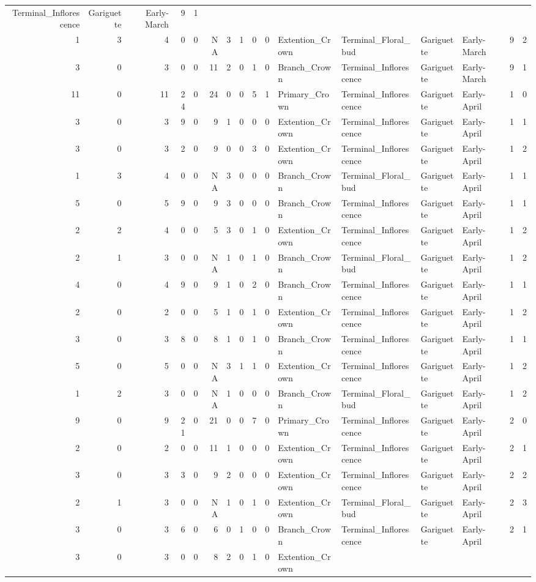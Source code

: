 \documentclass[]{article}
\begin{document}
\begin{longtable}[]{@{}rrrrrrrrrrllllrl@{}}
Terminal\_Inflorescence & Gariguette & Early-March & 9 &
1\tabularnewline
1 & 3 & 4 & 0 & 0 & NA & 3 & 1 & 0 & 0 & Extention\_Crown &
Terminal\_Floral\_bud & Gariguette & Early-March & 9 & 2\tabularnewline
3 & 0 & 3 & 0 & 0 & 11 & 2 & 0 & 1 & 0 & Branch\_Crown &
Terminal\_Inflorescence & Gariguette & Early-March & 9 &
1\tabularnewline
11 & 0 & 11 & 24 & 0 & 24 & 0 & 0 & 5 & 1 & Primary\_Crown &
Terminal\_Inflorescence & Gariguette & Early-April & 1 &
0\tabularnewline
3 & 0 & 3 & 9 & 0 & 9 & 1 & 0 & 0 & 0 & Extention\_Crown &
Terminal\_Inflorescence & Gariguette & Early-April & 1 &
1\tabularnewline
3 & 0 & 3 & 2 & 0 & 9 & 0 & 0 & 3 & 0 & Extention\_Crown &
Terminal\_Inflorescence & Gariguette & Early-April & 1 &
2\tabularnewline
1 & 3 & 4 & 0 & 0 & NA & 3 & 0 & 0 & 0 & Branch\_Crown &
Terminal\_Floral\_bud & Gariguette & Early-April & 1 & 1\tabularnewline
5 & 0 & 5 & 9 & 0 & 9 & 3 & 0 & 0 & 0 & Branch\_Crown &
Terminal\_Inflorescence & Gariguette & Early-April & 1 &
1\tabularnewline
2 & 2 & 4 & 0 & 0 & 5 & 3 & 0 & 1 & 0 & Extention\_Crown &
Terminal\_Inflorescence & Gariguette & Early-April & 1 &
2\tabularnewline
2 & 1 & 3 & 0 & 0 & NA & 1 & 0 & 1 & 0 & Branch\_Crown &
Terminal\_Floral\_bud & Gariguette & Early-April & 1 & 2\tabularnewline
4 & 0 & 4 & 9 & 0 & 9 & 1 & 0 & 2 & 0 & Branch\_Crown &
Terminal\_Inflorescence & Gariguette & Early-April & 1 &
1\tabularnewline
2 & 0 & 2 & 0 & 0 & 5 & 1 & 0 & 1 & 0 & Extention\_Crown &
Terminal\_Inflorescence & Gariguette & Early-April & 1 &
2\tabularnewline
3 & 0 & 3 & 8 & 0 & 8 & 1 & 0 & 1 & 0 & Branch\_Crown &
Terminal\_Inflorescence & Gariguette & Early-April & 1 &
1\tabularnewline
5 & 0 & 5 & 0 & 0 & NA & 3 & 1 & 1 & 0 & Extention\_Crown &
Terminal\_Inflorescence & Gariguette & Early-April & 1 &
2\tabularnewline
1 & 2 & 3 & 0 & 0 & NA & 1 & 0 & 0 & 0 & Branch\_Crown &
Terminal\_Floral\_bud & Gariguette & Early-April & 1 & 2\tabularnewline
9 & 0 & 9 & 21 & 0 & 21 & 0 & 0 & 7 & 0 & Primary\_Crown &
Terminal\_Inflorescence & Gariguette & Early-April & 2 &
0\tabularnewline
2 & 0 & 2 & 0 & 0 & 11 & 1 & 0 & 0 & 0 & Extention\_Crown &
Terminal\_Inflorescence & Gariguette & Early-April & 2 &
1\tabularnewline
3 & 0 & 3 & 3 & 0 & 9 & 2 & 0 & 0 & 0 & Extention\_Crown &
Terminal\_Inflorescence & Gariguette & Early-April & 2 &
2\tabularnewline
2 & 1 & 3 & 0 & 0 & NA & 1 & 0 & 1 & 0 & Extention\_Crown &
Terminal\_Floral\_bud & Gariguette & Early-April & 2 & 3\tabularnewline
3 & 0 & 3 & 6 & 0 & 6 & 0 & 1 & 0 & 0 & Branch\_Crown &
Terminal\_Inflorescence & Gariguette & Early-April & 2 &
1\tabularnewline
3 & 0 & 3 & 0 & 0 & 8 & 2 & 0 & 1 & 0 & Extention\_Crown &

\end{longtable}
\end{document}
